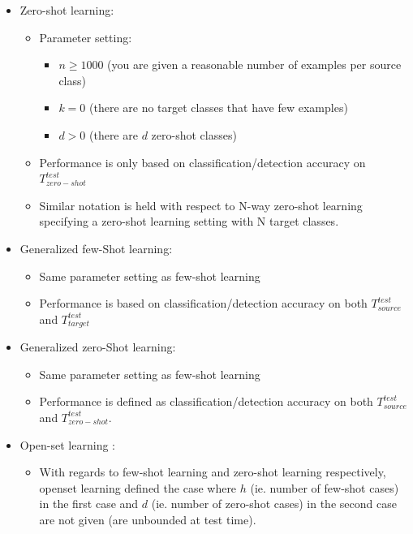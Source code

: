 \documentclass{article}
\begin{document}
\begin{itemize}
\begin{itemize}
\begin{itemize}
            \end{itemize}
            \item Zero-shot learning:
            \begin{itemize}
                \item Parameter setting:
                \begin{itemize}
                    \item $n \ge 1000$ (you are given a reasonable number of examples per source class)
                    \item $k = 0$ (there are no target classes that have few examples)
                    \item $d > 0$ (there are $d$ zero-shot classes)
                \end{itemize}
                \item Performance is only based on classification/detection accuracy on $T_{zero-shot}^{test}$
                \item Similar notation is held with respect to N-way zero-shot learning specifying a zero-shot learning setting with N target classes.
            \end{itemize}
            \item Generalized few-Shot learning:
            \begin{itemize}
                \item Same parameter setting as few-shot learning
                \item Performance is based on classification/detection accuracy on both $T_{source}^{test}$ and $T_{target}^{test}$
            \end{itemize}
            \item Generalized zero-Shot learning:
            \begin{itemize}
                \item Same parameter setting as few-shot learning
                \item Performance is defined as classification/detection accuracy on both $T_{source}^{test}$ and $T_{zero-shot}^{test}$.
            \end{itemize}
            \item Open-set learning \cite{DBLP:journals/corr/geng2018}:
            \begin{itemize}
                \item With regards to few-shot learning and zero-shot learning respectively, openset learning defined the case where $h$ (ie. number of few-shot cases) in the first case and $d$ (ie. number of zero-shot cases) in the second case are not given (are unbounded at test time).

\end{itemize}
\end{itemize}
\end{itemize}
\end{document}

